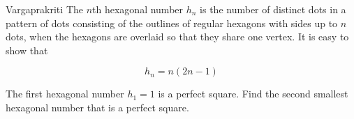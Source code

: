 \begin{problem}{Vargaprakriti}
    The \(n\)th hexagonal number \(h_n\) is the number of distinct dots in a pattern of dots consisting of the outlines of regular hexagons with sides up to \(n\) dots, when the hexagons are overlaid so that they share one vertex. It is easy to show that

    \[
    h_n = n(2n - 1)
    \]

    The first hexagonal number \(h_1 = 1\) is a perfect square. Find the second smallest hexagonal number that is a perfect square.

\end{problem}
